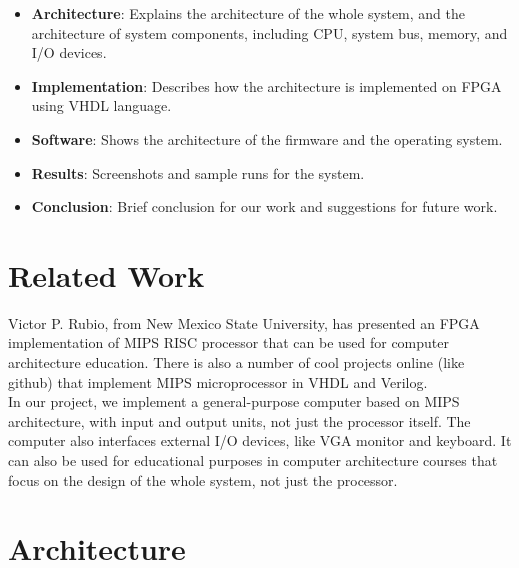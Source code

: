 \documentclass[oneside]{book}
\begin{document}
\begin{itemize}

\item \textbf{Architecture}: Explains the architecture of the whole system,
and the architecture of system components, including CPU, system bus,
memory, and I/O devices.

\item \textbf{Implementation}: Describes how the architecture is implemented
on FPGA using VHDL language.

\item \textbf{Software}: Shows the architecture of the firmware and the
operating system.

\item \textbf{Results}: Screenshots and sample runs for the system.

\item \textbf{Conclusion}: Brief conclusion for our work and suggestions for
future work.

\end{itemize}


\chapter{Related Work}

Victor P. Rubio, from New Mexico State University, has presented an
FPGA implementation of MIPS RISC processor that can be used for
computer architecture education. There is also a number of cool projects
online (like github) that implement MIPS microprocessor in VHDL and Verilog.\\

In our project, we implement a general-purpose computer based on
MIPS architecture, with input and output units, not just the processor
itself. The computer also interfaces external I/O devices, like
VGA monitor and keyboard. It can also be used for educational purposes
in computer architecture
courses that focus on the design of the whole system, not just the processor.\\


\chapter{Architecture}
\end{document}
